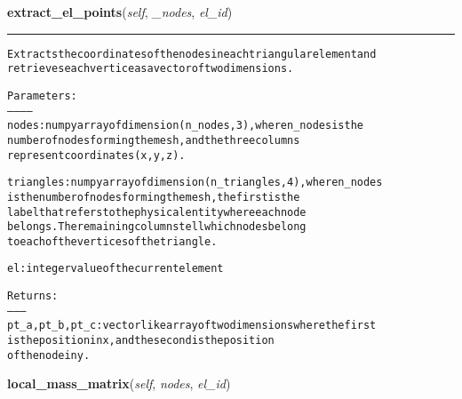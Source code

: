     \vspace{0.5ex}

\hspace{.8\funcindent}\begin{boxedminipage}{\funcwidth}

    \raggedright \textbf{extract\_el\_points}(\textit{self}, \textit{\_nodes}, \textit{el\_id})

    \vspace{-1.5ex}

    \rule{\textwidth}{0.5\fboxrule}
\setlength{\parskip}{2ex}
\begin{alltt}

Extracts the coordinates of the nodes in each triangular element and
retrieves each vertice as a vector of two dimensions.

Parameters:
-----------
nodes:  numpy array of dimension (n\_nodes, 3), where n\_nodes is the 
        number of nodes forming the mesh, and the three columns 
        represent coordinates (x, y, z).

triangles:  numpy array of dimension (n\_triangles, 4), where n\_nodes 
            is the number of nodes forming the mesh, the first is the 
            label that refers to the physical entity where each node 
            belongs. The remaining columns  tell which nodes belong
            to each of the vertices of the triangle.
            
el:   integer value of the current element

Returns:
--------
pt\_a, pt\_b, pt\_c:  vector like array of two dimensions where the first 
                   is the position in x, and the second is the position 
                   of the node in y.  
\end{alltt}

\setlength{\parskip}{1ex}
    \end{boxedminipage}

    \label{Classes:Triangles:local_mass_matrix}

    \vspace{0.5ex}

\hspace{.8\funcindent}\begin{boxedminipage}{\funcwidth}

    \raggedright \textbf{local\_mass\_matrix}(\textit{self}, \textit{nodes}, \textit{el\_id})

\setlength{\parskip}{2ex}
\setlength{\parskip}{1ex}
    \end{boxedminipage}

